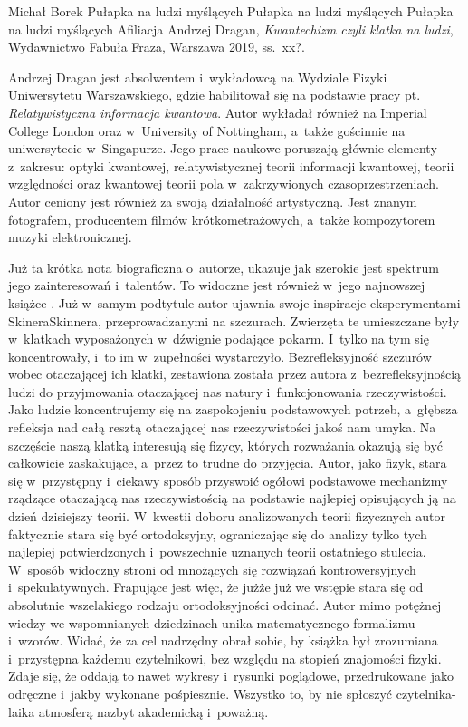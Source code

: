 \begin{newrevplenv}{Michał Borek}
	{Pułapka na ludzi myślących}
	{Pułapka na ludzi myślących}
	{Pułapka na ludzi myślących}
	{Afiliacja}
	{Andrzej Dragan, \textit{Kwantechizm czyli klatka na ludzi}, Wydawnictwo Fabuła Fraza, Warszawa 2019, ss.~xx?.}


\lettrine[loversize=0.13,lines=2,lraise=-0.03,nindent=0em,findent=0.2pt]%
{A}{}ndrzej Dragan jest absolwentem i~wykładowcą na Wydziale Fizyki Uniwersytetu Warszawskiego, gdzie habilitował się na podstawie pracy pt. \textit{Relatywistyczna informacja kwantowa}. Autor wykładał również na Imperial College London oraz w~University of Nottingham, a~także gościnnie na uniwersytecie w~Singapurze. Jego prace naukowe poruszają głównie elementy z~zakresu: optyki kwantowej, relatywistycznej teorii informacji kwantowej, teorii względności oraz kwantowej teorii pola w~zakrzywionych czasoprzestrzeniach. Autor ceniony jest również za swoją działalność artystyczną. Jest znanym fotografem, producentem filmów krótkometrażowych, a~także kompozytorem muzyki elektronicznej.

Już ta krótka nota biograficzna o~autorze, ukazuje jak szerokie jest spektrum jego zainteresowań i~talentów. To widoczne jest również w~jego najnowszej książce
\parencite[][]{dragan_kwantechizm_2019}. %
 Już w~samym podtytule autor ujawnia swoje inspiracje eksperymentami SkineraSkinnera, przeprowadzanymi na szczurach. Zwierzęta te umieszczane były w~klatkach wyposażonych w~dźwignie podające pokarm. I~tylko na tym się koncentrowały, i~to im w~zupełności wystarczyło. Bezrefleksyjność szczurów wobec otaczającej ich klatki, zestawiona została przez autora z~bezrefleksyjnością ludzi do przyjmowania otaczającej nas natury i~funkcjonowania rzeczywistości. Jako ludzie koncentrujemy się na zaspokojeniu podstawowych potrzeb, a~głębsza refleksja nad całą resztą otaczającej nas rzeczywistości jakoś nam umyka. Na szczęście naszą klatką interesują się fizycy, których rozważania okazują się być całkowicie zaskakujące, a~przez to trudne do przyjęcia. Autor, jako fizyk, stara się w~przystępny i~ciekawy sposób przyswoić ogółowi podstawowe mechanizmy rządzące otaczającą nas rzeczywistością na podstawie najlepiej opisujących ją na dzień dzisiejszy teorii. W~kwestii doboru analizowanych teorii fizycznych autor faktycznie stara się być ortodoksyjny, ograniczając się do analizy tylko tych najlepiej potwierdzonych i~powszechnie uznanych teorii ostatniego stulecia. W~sposób widoczny stroni od mnożących się rozwiązań kontrowersyjnych i~spekulatywnych. Frapujące jest więc, że jużże już we wstępie stara się od absolutnie wszelakiego rodzaju ortodoksyjności odcinać. Autor mimo potężnej wiedzy we wspomnianych dziedzinach unika matematycznego formalizmu i~wzorów. Widać, że za cel nadrzędny obrał sobie, by książka był zrozumiana i~przystępna każdemu czytelnikowi, bez względu na stopień znajomości fizyki. Zdaje się, że oddają to nawet wykresy i~rysunki poglądowe, przedrukowane jako odręczne i~jakby wykonane pośpiesznie. Wszystko to, by nie spłoszyć czytelnika-laika atmosferą nazbyt akademicką i~poważną.


\end{newrevplenv}
